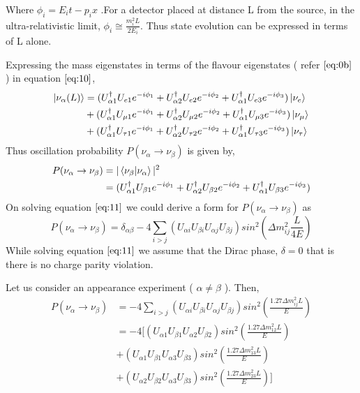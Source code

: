 \documentclass[12pt,a4paper]{report}
\begin{document}
Where $\phi_{i} = E_{i}t - p_{i}x$ .For a detector placed at distance L from the source, in the ultra-relativistic limit, $\phi_{i} \cong \frac{m_{i}^{2}L}{2E_{i}} $. Thus state evolution can be expressed in terms of L alone. \par
Expressing the mass eigenstates in terms of the flavour eigenstates ( refer $\ref{eq:0b}$ ) in equation $\ref{eq:10}$,
\begin{equation}
\begin{split}
\ket{\nu_{\alpha}(L)}&=(U_{\alpha 1}^{\dagger}U_{e1}e^{-i\phi_{1}}+U_{\alpha 2}^{\dagger}U_{e2}e^{-i\phi_{2}}+U_{\alpha 1}^{\dagger}U_{e3}e^{-i\phi_{3}})\ket{\nu_{e}}\\
&+(U_{\alpha 1}^{\dagger}U_{\mu 1}e^{-i\phi_{1}}+U_{\alpha 2}^{\dagger}U_{\mu 2}e^{-i\phi_{2}}+U_{\alpha 1}^{\dagger}U_{\mu 3}e^{-i\phi_{3}})\ket{\nu_{\mu}}\\
&+(U_{\alpha 1}^{\dagger}U_{\tau 1}e^{-i\phi_{1}}+U_{\alpha 2}^{\dagger}U_{\tau 2}e^{-i\phi_{2}}+U_{\alpha 1}^{\dagger}U_{\tau 3}e^{-i\phi_{3}})\ket{\nu_{\tau}}
\end{split}
\end{equation}
Thus oscillation probability $P(\nu_{\alpha} \rightarrow \nu_{\beta})$ is given by,
\begin{equation}
\label{eq:11}
\begin{split}
P(\nu_{\alpha} \rightarrow \nu_{\beta})& = |\braket{\nu_{\beta}|\nu_{\alpha}}|^{2}\\
&=(U_{\alpha 1}^{\dagger}U_{\beta 1}e^{-i\phi_{1}}+U_{\alpha 2}^{\dagger}U_{\beta 2}e^{-i\phi_{2}}+U_{\alpha 1}^{\dagger}U_{\beta 3}e^{-i\phi_{3}})
\end{split}
\end{equation}
On solving equation $\ref{eq:11}$ we could derive a form for $P(\nu_{\alpha} \rightarrow \nu_{\beta})$ as
\begin{equation}
\label{eq:12}
P(\nu_{\alpha} \rightarrow \nu_{\beta}) = \delta_{\alpha\beta} - 4\sum_{i>j}(U_{\alpha i}U_{\beta i}U_{\alpha j}U_{\beta j}) sin^{2}(\Delta m_{ij}^{2} \frac{L}{4E})
\end{equation} 
While solving equation $\ref{eq:11}$  we assume that the Dirac phase, $\delta = 0$ that is there is no charge parity violation. \par
Let us consider an appearance experiment ( $\alpha \neq \beta$ ). Then, 
\begin{equation}
\label{eq:13}
\begin{split}
P(\nu_{\alpha} \rightarrow \nu_{\beta} )& = -4\sum_{i>j} ( U_{\alpha i} U_{\beta i} U_{\alpha j} U_{\beta j}) sin^{2}( \frac{1.27 \Delta m_{ij}^{2}  L}{E})\\
&=-4[ ( U_{\alpha 1} U_{\beta 1} U_{\alpha 2} U_{\beta 2})sin^{2}( \frac{1.27\Delta m_{12}^{2} L}{E})\\
&+( U_{\alpha 1} U_{\beta 1} U_{\alpha 3} U_{\beta 3})sin^{2}( \frac{1.27\Delta m_{13}^{2} L}{E})\\
&+( U_{\alpha 2} U_{\beta 2} U_{\alpha 3} U_{\beta 3})sin^{2}( \frac{1.27\Delta m_{23}^{2} L}{E})]
\end{split}
\end{equation}
\end{document}

